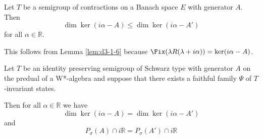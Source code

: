 \begin{corollary}\label{cor:d3-1-7}
Let $T$ be a semigroup of contractions on a Banach space $E$ with generator $A$.
Then
\[
\dim \ker(i\alpha - A) \leq \dim \ker(i\alpha - A')
\]
for all $\alpha \in \mathbb{R}$.
\end{corollary}

This follows from Lemma \ref{lem:d3-1-6} because $\Fix(\lambda R(\lambda+i\alpha)) = \ker(i\alpha-A)$.
\begin{proposition}\label{prop:d3-1-8}
Let $T$ be an identity preserving semigroup of Schwarz type with generator $A$ on the predual of a W*-algebra and suppose that there exists a faithful family $\Psi$ of $T$-invariant states.

Then for all $\alpha \in \mathbb{R}$ we have
\[
\dim \ker(i\alpha - A) = \dim \ker(i\alpha - A')
\]
and
\[
P_{\sigma}(A) \cap i\mathbb{R} = P_{\sigma}(A') \cap i\mathbb{R}
\]
\end{proposition}

